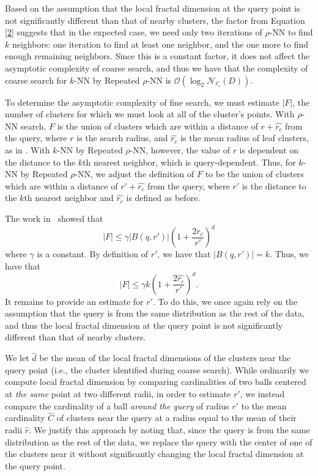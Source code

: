 Based on the assumption that the local fractal dimension at the query point is not significantly different than that of 
nearby clusters, the factor from Equation \ref{2} suggests that in the expected case, we need only two iterations of 
$\rho$-NN to find $k$ neighbors: one iteration to find at least one neighbor, and the one more to find enough remaining neighbors.
Since this is a constant factor, it does not affect the asymptotic complexity of coarse search, and thus we have that 
the complexity of coarse search for $k$-NN by Repeated $\rho$-NN is $\mathcal{O}(\log_2\mathcal{N}_{\hat{r_c}}(D))$.

To determine the asymptotic complexity of fine search, we must estimate $|F|$, the 
number of clusters for which we must look at all of the cluster's points. With $\rho$-NN 
search, $F$ is the union of clusters which are within a distance of $r + \hat{r_c}$ from the query,
where $r$ is the search radius, and $\hat{r_c}$ is the mean radius of leaf clusters,
as in \cite{yu2015entropy}. With $k$-NN by Repeated $\rho$-NN, however, 
the value of $r$ is dependent on the distance to the $k$th nearest neighbor, which 
is query-dependent. Thus, for $k$-NN by Repeated $\rho$-NN, we adjust the definition of 
$F$ to be the union of clusters which are within a distance of $r' + \hat{r_c}$ from the query, 
where $r'$ is the distance to the $k$th nearest neighbor and $\hat{r_c}$ is defined as before.

The work in~\cite{yu2015entropy} showed that \begin{equation} |F| \leq \gamma |B(q, r')|\left(1+ \frac{2\hat{r_c}}{r'}\right)^d \label{3} \end{equation} where $\gamma$ is a constant. 
By definition of 
$r'$, we have that $|B(q, r')| = k$. Thus, we have that \begin{equation} |F| \leq \gamma k\left(1+ \frac{2\hat{r_c}}{r'}\right)^d. \label{4} \end{equation} It remains to provide an estimate for $r'$. 
To do this, we once again rely on the assumption that the query is from the same distribution as the rest of the data, 
and thus the local fractal dimension at the query point is not significantly different than that of nearby clusters.



We let $\hat{d}$ be the mean of the local fractal dimensions of the clusters near the query point (i.e., the cluster identified during coarse search).
While ordinarily we compute local fractal dimension 
by comparing cardinalities of two balls centered at \emph{the same} point at two different radii, in order to estimate $r'$, 
we instead compare the cardinality of a ball \emph{around the query} of radius $r'$ to the mean cardinality $\hat{C}$ of clusters near the query 
at a radius equal to the mean of their radii $\hat{r}$.
We justify this approach by noting that, since the query is from the same distribution as the rest of the data, we replace the query with 
the center of one of the clusters near it without significantly changing the local fractal dimension at the query point. 



